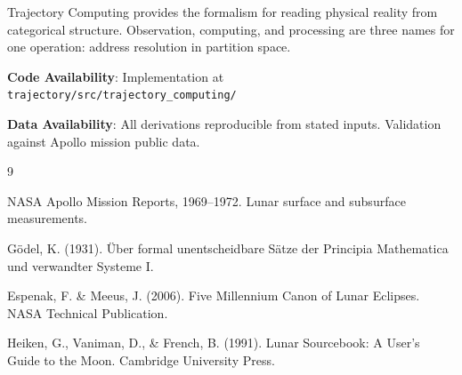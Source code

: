 \documentclass[12pt,a4paper]{article}
\theoremstyle{definition}
\theoremstyle{remark}
\begin{document}
Trajectory Computing provides the formalism for reading physical reality from categorical structure. Observation, computing, and processing are three names for one operation: address resolution in partition space.

\vspace{1em}
\noindent\textbf{Code Availability}: Implementation at \texttt{trajectory/src/trajectory\_computing/}

\vspace{1em}
\noindent\textbf{Data Availability}: All derivations reproducible from stated inputs. Validation against Apollo mission public data.


\begin{thebibliography}{9}

NASA Apollo Mission Reports, 1969--1972. Lunar surface and subsurface measurements.

G\"{o}del, K. (1931). \"{U}ber formal unentscheidbare S\"{a}tze der Principia Mathematica und verwandter Systeme I.

Espenak, F. \& Meeus, J. (2006). Five Millennium Canon of Lunar Eclipses. NASA Technical Publication.

Heiken, G., Vaniman, D., \& French, B. (1991). Lunar Sourcebook: A User's Guide to the Moon. Cambridge University Press.

\end{thebibliography}
\end{document}
